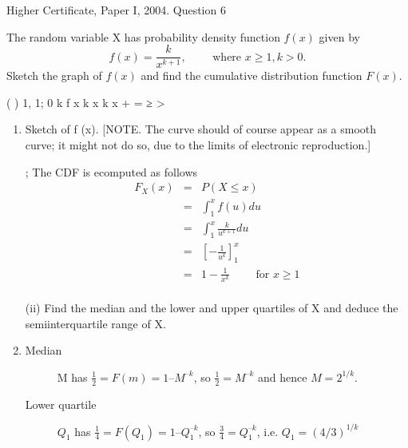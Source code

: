 \documentclass[a4paper,12pt]{article}
\begin{document}
Higher Certificate, Paper I, 2004. Question 6
\begin{framed}
The random variable X has probability density function $f(x)$ given by
\[ f(x) =  \frac{k}{x^{k+1}}, \qquad \mbox{  where  } x \geq  1, k > 0.\]
Sketch the graph of $f(x)$ and find the cumulative distribution function $F(x)$.



\end{framed}
( ) 1, 1; 0 k
f x k x k
x + = ≥ >

\begin{enumerate}

\item  Sketch of f (x).
[NOTE. The curve should of course appear as a smooth curve; it might not do so,
due to the limits of electronic reproduction.]

;
The CDF is ecomputed as follows
\begin{eqnarray*}
F_X(x) &=& P(X \leq x)\\
&=& \int^{x}_{1}  f(u) du\\
&=& \int^{x}_{1}  \frac{k}{u^{k+1}} du\\
&=& \left[ - \frac{1}{u^k} \right]^x_1  \\
&=& 1 - \frac{1}{x^k}  \qquad \mbox{ for } x \geq 1 \\
\end{eqnarray*}



\newpage
\begin{framed}
(ii) Find the median and the lower and upper quartiles of X and deduce the semiinterquartile
range of X.
\end{framed}

\item  




\begin{description}

\item[Median]       
M has ${ \displaystyle \frac{1}{2} = F(m) = 1 – M^{–k} }$, so 
${ \displaystyle \frac{1}{2} = M^{–k} }$ and hence $M = 2^{1/k}$. 

\item[Lower quartile] $Q_1$ has ${ \displaystyle \frac{1}{4} = F(Q_1) = 1 – Q_1^{–k} }$, so
${ \displaystyle \frac{3}{4} = Q_1^{–k} }$, i.e. $Q_1 = (4/3)^{1/k}$


\end{description}
\end{enumerate}
\end{document}
